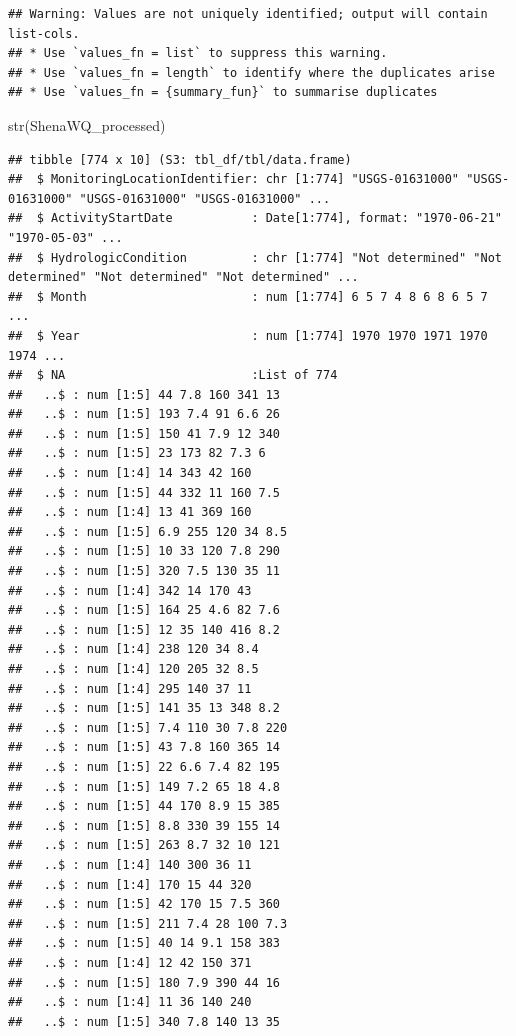 \documentclass[
  12pt,
]{article}
\newenvironment{Shaded}{\begin{snugshade}}{\end{snugshade}}
\newcommand{\FunctionTok}[1]{\textcolor[rgb]{0.00,0.00,0.00}{#1}}
\newcommand{\NormalTok}[1]{#1}
\begin{document}
\begin{verbatim}
## Warning: Values are not uniquely identified; output will contain list-cols.
## * Use `values_fn = list` to suppress this warning.
## * Use `values_fn = length` to identify where the duplicates arise
## * Use `values_fn = {summary_fun}` to summarise duplicates
\end{verbatim}

\begin{Shaded}
\begin{Highlighting}[]
\FunctionTok{str}\NormalTok{(ShenaWQ\_processed)}
\end{Highlighting}
\end{Shaded}

\begin{verbatim}
## tibble [774 x 10] (S3: tbl_df/tbl/data.frame)
##  $ MonitoringLocationIdentifier: chr [1:774] "USGS-01631000" "USGS-01631000" "USGS-01631000" "USGS-01631000" ...
##  $ ActivityStartDate           : Date[1:774], format: "1970-06-21" "1970-05-03" ...
##  $ HydrologicCondition         : chr [1:774] "Not determined" "Not determined" "Not determined" "Not determined" ...
##  $ Month                       : num [1:774] 6 5 7 4 8 6 8 6 5 7 ...
##  $ Year                        : num [1:774] 1970 1970 1971 1970 1974 ...
##  $ NA                          :List of 774
##   ..$ : num [1:5] 44 7.8 160 341 13
##   ..$ : num [1:5] 193 7.4 91 6.6 26
##   ..$ : num [1:5] 150 41 7.9 12 340
##   ..$ : num [1:5] 23 173 82 7.3 6
##   ..$ : num [1:4] 14 343 42 160
##   ..$ : num [1:5] 44 332 11 160 7.5
##   ..$ : num [1:4] 13 41 369 160
##   ..$ : num [1:5] 6.9 255 120 34 8.5
##   ..$ : num [1:5] 10 33 120 7.8 290
##   ..$ : num [1:5] 320 7.5 130 35 11
##   ..$ : num [1:4] 342 14 170 43
##   ..$ : num [1:5] 164 25 4.6 82 7.6
##   ..$ : num [1:5] 12 35 140 416 8.2
##   ..$ : num [1:4] 238 120 34 8.4
##   ..$ : num [1:4] 120 205 32 8.5
##   ..$ : num [1:4] 295 140 37 11
##   ..$ : num [1:5] 141 35 13 348 8.2
##   ..$ : num [1:5] 7.4 110 30 7.8 220
##   ..$ : num [1:5] 43 7.8 160 365 14
##   ..$ : num [1:5] 22 6.6 7.4 82 195
##   ..$ : num [1:5] 149 7.2 65 18 4.8
##   ..$ : num [1:5] 44 170 8.9 15 385
##   ..$ : num [1:5] 8.8 330 39 155 14
##   ..$ : num [1:5] 263 8.7 32 10 121
##   ..$ : num [1:4] 140 300 36 11
##   ..$ : num [1:4] 170 15 44 320
##   ..$ : num [1:5] 42 170 15 7.5 360
##   ..$ : num [1:5] 211 7.4 28 100 7.3
##   ..$ : num [1:5] 40 14 9.1 158 383
##   ..$ : num [1:4] 12 42 150 371
##   ..$ : num [1:5] 180 7.9 390 44 16
##   ..$ : num [1:4] 11 36 140 240
##   ..$ : num [1:5] 340 7.8 140 13 35

\end{verbatim}
\end{document}
